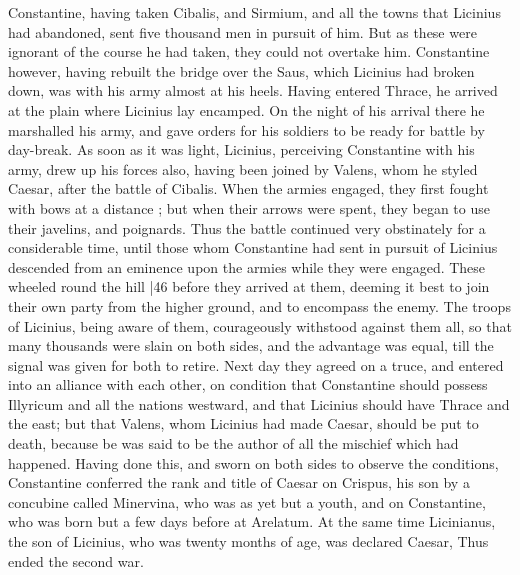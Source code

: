 Constantine, having taken Cibalis, and Sirmium, and all the towns that Licinius had abandoned, sent five thousand men in pursuit of him. But as these were ignorant of the course he had taken, they could not overtake him. Constantine however, having rebuilt the bridge over the Saus, which Licinius had broken down, was with his army almost at his heels. Having entered Thrace, he arrived at the plain where Licinius lay encamped. On the night of his arrival there he marshalled his army, and gave orders for his soldiers to be ready for battle by day-break. As soon as it was light, Licinius, perceiving Constantine with his army, drew up his forces also, having been joined by Valens, whom he styled Caesar, after the battle of Cibalis. When the armies engaged, they first fought with bows at a distance ; but when their arrows were spent, they began to use their javelins, and poignards. Thus the battle continued very obstinately for a considerable time, until those whom Constantine had sent in pursuit of Licinius descended from an eminence upon the armies while they were engaged. These wheeled round the hill
|46 before they arrived at them, deeming it best to join their own party from the higher ground, and to encompass the enemy. The troops of Licinius, being aware of them, courageously withstood against them all, so that many thousands were slain on both sides, and the advantage was equal, till the signal was given for both to retire. Next day they agreed on a truce, and entered into an alliance with each other, on condition that Constantine should possess Illyricum and all the nations westward, and that Licinius should have Thrace and the east; but that Valens, whom Licinius had made Caesar, should be put to death, because be was said to be the author of all the mischief which had happened. Having done this, and sworn on both sides to observe the conditions, Constantine conferred the rank and title of Caesar on Crispus, his son by a concubine called Minervina, who was as yet but a youth, and on Constantine, who was born but a few days before at Arelatum. At the same time Licinianus, the son of Licinius, who was twenty
months of age, was declared Caesar, Thus ended the second war.

